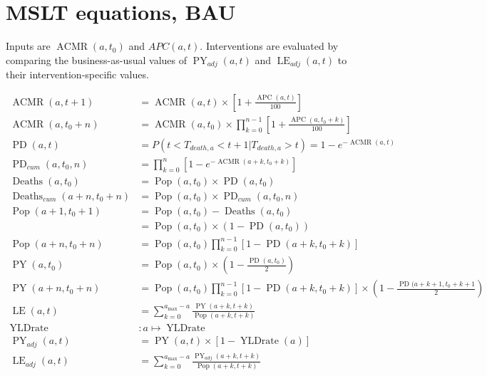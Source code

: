 \documentclass[12pt]{scrartcl}
\DeclareMathOperator{\APC}{APC}
\DeclareMathOperator{\ACMR}{ACMR}
\DeclareMathOperator{\PD}{PD}
\DeclareMathOperator{\PY}{PY}
\DeclareMathOperator{\LE}{LE}
\DeclareMathOperator{\Pop}{Pop}
\DeclareMathOperator{\Deaths}{Deaths}
\DeclareMathOperator{\YLDrate}{YLDrate}
\begin{document}
\section*{MSLT equations, BAU}

Inputs are \(\ACMR(a,t_0)\) and \(APC(a, t)\).
Interventions are evaluated by comparing the business-as-usual values of
\(\PY_{adj}(a, t)\) and \(\LE_{adj}(a, t)\) to their intervention-specific
values.

\begin{align*}
  \ACMR(a, t+1) &= \ACMR(a, t) \times \left[ 1 + \frac{\APC(a, t)}{100}\right] \\
  \ACMR(a, t_0+n) &= \ACMR(a, t_0) \times
  \prod_{k=0}^{n-1} \left[ 1 + \frac{\APC(a, t_0 + k)}{100} \right] \\
  \PD(a, t) &= P(t < T_{death,a} < t + 1 | T_{death,a} > t) = 1 - e^{-\ACMR(a, t)} \\
  \PD_{cum}(a, t_0, n) &= \prod_{k = 0}^n \left[ 1 - e^{-\ACMR(a+k, t_0+k)} \right] \\
  \Deaths(a, t_0) &= \Pop(a, t_0) \times \PD(a, t_0) \\
  \Deaths_{cum}(a+n, t_0+n) &= \Pop(a, t_0) \times \PD_{cum}(a, t_0, n) \\
  \Pop(a+1, t_0+1) &= \Pop(a, t_0) - \Deaths(a, t_0) \\
  &= \Pop(a, t_0) \times (1 - \PD(a, t_0)) \\
  \Pop(a+n, t_0+n) &= \Pop(a, t_0) \prod_{k=0}^{n-1}\left[1 - \PD(a+k, t_0+k)\right]\\
  \PY(a, t_0) &= \Pop(a, t_0) \times \left(1 - \frac{\PD(a,t_0)}{2}\right) \\
  \PY(a+n, t_0+n) &= \Pop(a, t_0) \prod_{k=0}^{n-1} \left[ 1 - \PD(a+k, t_0+k) \right]
  \times \left(1 - \frac{\PD(a+k+1, t_0+k+1}{2}\right) \\
  \LE(a, t) &= \sum_{k=0}^{a_{\max}-a} \frac{\PY(a+k,t+k)}{\Pop(a+k, t+k)} \\
  \YLDrate &: a \mapsto \YLDrate \\
  \PY_{adj}(a, t) &= \PY(a, t) \times \left[1 - \YLDrate(a)\right] \\
  \LE_{adj}(a, t) &= \sum_{k=0}^{a_{\max}-a} \frac{\PY_{adj}(a+k, t+k)}{\Pop(a+k, t+k)}
\end{align*}
\end{document}
